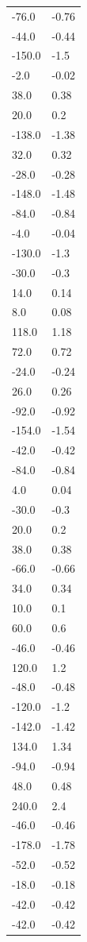 \begin{longtable}{ll}
-76.0 & -0.76 \\
-44.0 & -0.44 \\
-150.0 & -1.5 \\
-2.0 & -0.02 \\
38.0 & 0.38 \\
20.0 & 0.2 \\
-138.0 & -1.38 \\
32.0 & 0.32 \\
-28.0 & -0.28 \\
-148.0 & -1.48 \\
-84.0 & -0.84 \\
-4.0 & -0.04 \\
-130.0 & -1.3 \\
-30.0 & -0.3 \\
14.0 & 0.14 \\
8.0 & 0.08 \\
118.0 & 1.18 \\
72.0 & 0.72 \\
-24.0 & -0.24 \\
26.0 & 0.26 \\
-92.0 & -0.92 \\
-154.0 & -1.54 \\
-42.0 & -0.42 \\
-84.0 & -0.84 \\
4.0 & 0.04 \\
-30.0 & -0.3 \\
20.0 & 0.2 \\
38.0 & 0.38 \\
-66.0 & -0.66 \\
34.0 & 0.34 \\
10.0 & 0.1 \\
60.0 & 0.6 \\
-46.0 & -0.46 \\
120.0 & 1.2 \\
-48.0 & -0.48 \\
-120.0 & -1.2 \\
-142.0 & -1.42 \\
134.0 & 1.34 \\
-94.0 & -0.94 \\
48.0 & 0.48 \\
240.0 & 2.4 \\
-46.0 & -0.46 \\
-178.0 & -1.78 \\
-52.0 & -0.52 \\
-18.0 & -0.18 \\
-42.0 & -0.42 \\
-42.0 & -0.42 \\

\end{longtable}
